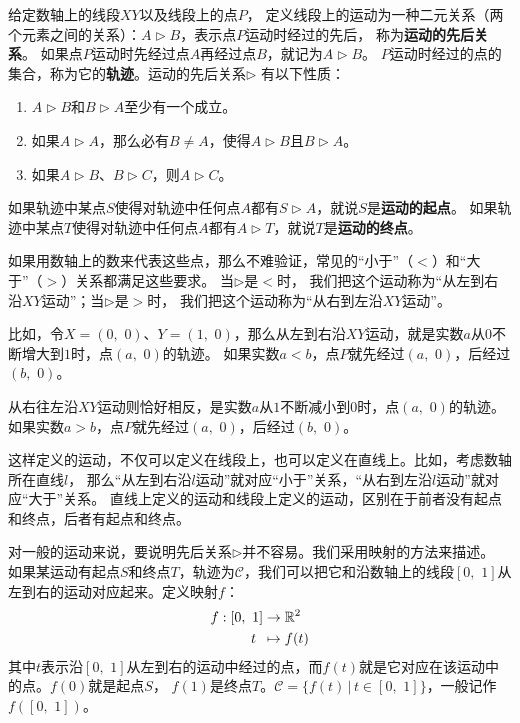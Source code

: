 \documentclass[12pt,UTF8]{ctexbook}
\begin{document}
给定数轴上的线段$XY$以及线段上的点$P$，
定义线段上的运动为一种二元关系（两个元素之间的关系）：$A \triangleright B$，表示点$P$运动时经过的先后，
称为\textbf{运动的先后关系}。
如果点$P$运动时先经过点$A$再经过点$B$，就记为$A \triangleright B$。
$P$运动时经过的点的集合，称为它的\textbf{轨迹}。运动的先后关系$\triangleright$
有以下性质：
\begin{enumerate}
    \item $A \triangleright B$和$B \triangleright A$至少有一个成立。
    \item 如果$A \triangleright A$，那么必有$B\neq A$，使得$A \triangleright B$且$B \triangleright A$。
    \item 如果$A \triangleright B$、$B \triangleright C$，则$A \triangleright C$。
\end{enumerate}
如果轨迹中某点$S$使得对轨迹中任何点$A$都有$S \triangleright A$，就说$S$是\textbf{运动的起点}。
如果轨迹中某点$T$使得对轨迹中任何点$A$都有$A \triangleright T$，就说$T$是\textbf{运动的终点}。

如果用数轴上的数来代表这些点，那么不难验证，常见的“小于”（$<$）和“大于”（$>$）关系都满足这些要求。
当$\triangleright$是$<$时，
我们把这个运动称为“从左到右沿$XY$运动”；当$\triangleright$是$>$时，
我们把这个运动称为“从右到左沿$XY$运动”。

比如，令$X = (0,\,\,0)$、$Y = (1,\,\,0)$，那么从左到右沿$XY$运动，就是实数$a$从$0$不断增大到$1$时，点$(a,\,\,0)$的轨迹。
如果实数$a<b$，点$P$就先经过$(a,\,\,0)$，后经过$(b,\,\,0)$。

从右往左沿$XY$运动则恰好相反，是实数$a$从$1$不断减小到$0$时，点$(a,\,\,0)$的轨迹。
如果实数$a>b$，点$P$就先经过$(a,\,\,0)$，后经过$(b,\,\,0)$。

这样定义的运动，不仅可以定义在线段上，也可以定义在直线上。比如，考虑数轴所在直线$l$，
那么“从左到右沿$l$运动”就对应“小于”关系，“从右到左沿$l$运动”就对应“大于”关系。
直线上定义的运动和线段上定义的运动，区别在于前者没有起点和终点，后者有起点和终点。

对一般的运动来说，要说明先后关系$\triangleright$并不容易。我们采用映射的方法来描述。
如果某运动有起点$S$和终点$T$，轨迹为$\mathcal{C}$，我们可以把它和沿数轴上的线段$[0,\,\,1]$从左到右的运动对应起来。定义映射$f$：
\begin{align}
    f: [0,\,\,1] &\rightarrow \mathbb{R}^2 \notag \\
         t \,\,\, &\mapsto f(t) \notag
\end{align}
其中$t$表示沿$[0,\,\,1]$从左到右的运动中经过的点，而$f(t)$就是它对应在该运动中的点。$f(0)$就是起点$S$，
$f(1)$是终点$T$。$\mathcal{C} = \{f(t)\,|\,t\in[0,\,\,1]\}$，一般记作$f([0,\,\,1])$。
\end{document}
